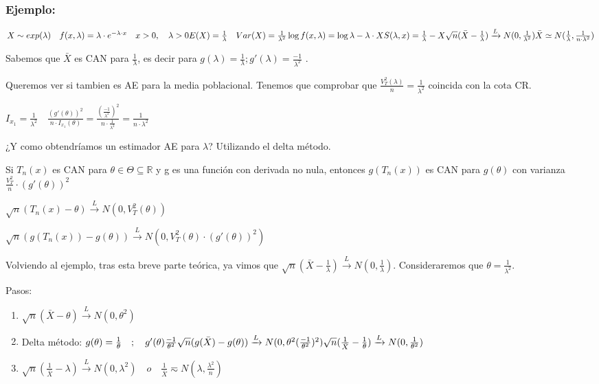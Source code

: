 \subsubsection*{Ejemplo:}

\(
X \sim exp(\lambda) \quad f(x,\lambda)=\lambda \cdot e^{-\lambda \cdot x} \quad x>0, \quad \lambda>0
\\ E(X) = \frac{1}{\lambda} \quad Var(X)=\frac{1}{\lambda^2}
\\ \log f(x,\lambda)= \log \lambda - \lambda \cdot X
\\ S(\lambda,x)=\frac{1}{\lambda}-X
\\ \sqrt{n}(\bar{X}-\frac{1}{\lambda}) \xrightarrow{L} N(0,\frac{1}{\lambda^2})
\\ \bar{X} \simeq N(\frac{1}{\lambda},\frac{1}{n \cdot \lambda^2})
\)

Sabemos que $\bar{X}$ es CAN para $\frac{1}{\lambda}$, es decir para
$g(\lambda)=\frac{1}{\lambda} ;  g'(\lambda)=\frac{-1}{\lambda^2}$
.

Queremos ver si tambien es AE para la media poblacional. Tenemos que comprobar que $\frac{V_T^2(\lambda)}{n}=\frac{1}{\lambda^2}$
coincida con la cota CR.

\(
I_{x_1}=\frac{1}{\lambda^2} \quad \frac{(g'(\theta))^2}{n \cdot I_{x_1}(\theta)}=
\frac{(\frac{-1}{\lambda^2})^2}{n \cdot \frac{1}{\lambda^2}}=\frac{1}{n \cdot \lambda^2}
\)

¿Y como obtendríamos un estimador AE para $\lambda$?
Utilizando el delta método.

Si $T_n(x)$ es CAN para $\theta \in \Theta \subseteq \mathbb{R}$ y g es una función con derivada no nula,
entonces $g(T_n(x))$ es CAN para $g(\theta)$ con varianza $\frac{V_T^2}{n}\cdot (g'(\theta))^2$

$\sqrt{n}(T_n(x)-\theta) \xrightarrow{L}N(0,V_T^2(\theta))$

$\sqrt{n}(g(T_n(x))-g(\theta)) \xrightarrow{L} N(0,V_T^2(\theta)\cdot(g'(\theta))^2)$

Volviendo al ejemplo, tras esta breve parte teórica, ya vimos que $\sqrt{n}(\bar{X}-\frac{1}{\lambda})\xrightarrow{L} N(0,\frac{1}{\lambda})$.
Consideraremos que $\theta=\frac{1}{\lambda^2}$.

Pasos:
\begin{enumerate}
    \item $\sqrt{n}(\bar{X}-\theta)\xrightarrow{L}N(0,\theta^2)$
    \item Delta método:
          \(
          \\ g(\theta)=\frac{1}{\theta} \quad;\quad g'(\theta)\frac{-1}{\theta^2}
          \\ \sqrt{n}(g(\bar{X})-g(\theta)) \xrightarrow{L} N(0,\theta^2(\frac{-1}{\theta^2})^2)
          \\ \sqrt{n}(\frac{1}{\bar{X}}-\frac{1}{\theta}) \xrightarrow{L} N(0,\frac{1}{\theta^2})
          \)
    \item $ \sqrt{n}(\frac{1}{\bar{X}}-\lambda) \xrightarrow{L} N(0,\lambda^2) \quad o \quad
              \frac{1}{\bar{X}}\eqsim N(\lambda,\frac{\lambda^2}{n})$
\end{enumerate}

